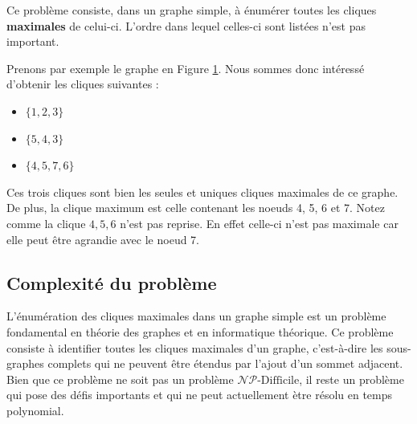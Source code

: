 \documentclass[12pt,a4paper]{article}
\begin{document}
Ce problème consiste, dans un graphe simple, à énumérer toutes les cliques \textbf{maximales} de celui-ci. L'ordre dans lequel celles-ci sont listées n'est pas important.

\begin{figure}[h]
  \begin{center}
    \caption{}
    \label{fig:x clique3}
  \end{center}
\end{figure}


Prenons par exemple le graphe en Figure \ref{fig:x clique3}. Nous sommes donc intéressé d'obtenir les cliques suivantes :
\begin{itemize}
        \item \(\{1, 2, 3\}\)
        \item \(\{5, 4, 3\}\)
        \item \(\{4, 5, 7, 6\}\)
\end{itemize}
Ces trois cliques sont bien les seules et uniques cliques maximales de ce graphe. De plus, la clique maximum est celle contenant les noeuds 4, 5, 6 et 7.
Notez comme la clique \({4, 5, 6}\) n'est pas reprise. En effet celle-ci n'est pas maximale car elle peut être agrandie avec le noeud 7.

\subsection{Complexité du problème}
L'énumération des cliques maximales dans un graphe simple est un problème fondamental en théorie des graphes et en informatique théorique. Ce problème consiste à identifier toutes les cliques maximales d'un graphe, c'est-à-dire les sous-graphes complets qui ne peuvent être étendus par l'ajout d'un sommet adjacent. Bien que ce problème ne soit pas un problème \(\mathcal{N}\mathcal{P}\text{-Difficile}\), il reste un problème qui pose des défis importants et qui ne peut actuellement ètre résolu en temps polynomial.
\end{document}
